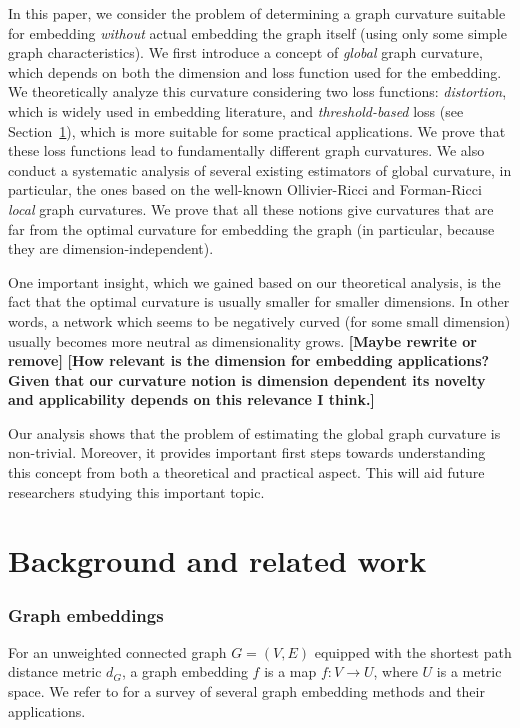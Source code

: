 \documentclass[runningheads]{llncs}
\newcommand{\ch}[1]{{\color{red} #1}}
\begin{document}
In this paper, we \ch{consider the problem} of determining a graph curvature suitable for embedding \textit{without} actual embedding the graph itself (using only some simple graph characteristics). 
We first introduce a concept of \textit{global} graph curvature, which depends on both the dimension and loss function used for the embedding. 
We theoretically analyze this curvature considering two loss functions: \emph{distortion}, which is widely used in embedding literature, and \emph{threshold-based} loss (see Section~\ref{sec:related_work}), which is more suitable for some practical applications. 
We prove that these loss functions lead to fundamentally different graph curvatures. 
We also conduct a systematic analysis of several existing estimators of global curvature, in particular, the ones based on the well-known Ollivier-Ricci and Forman-Ricci \textit{local} graph curvatures. 
We prove that all these notions give curvatures that are far from the optimal curvature for embedding the graph (in particular, because they are dimension-independent). 

One important insight, which we gained based on our theoretical analysis, is the fact that the optimal curvature is usually smaller for smaller dimensions. In other words, a network which seems to be negatively curved (for some small dimension) usually becomes more neutral as dimensionality grows. \textbf{[Maybe rewrite or remove]}
\textbf{[How relevant is the dimension for embedding applications? Given that our curvature notion is dimension dependent its novelty and applicability depends on this relevance I think.]}

Our analysis shows that the problem of estimating the global graph curvature is non-trivial. \ch{Moreover, it provides important first steps towards understanding this concept from both a theoretical and practical aspect. This will aid future researchers studying this important topic.}  

\section{Background and related work}\label{sec:related_work}

\subsubsection{Graph embeddings} 
For an unweighted connected graph $G = (V,E)$ equipped with the shortest path distance metric $d_G$, a graph embedding $f$ is a map $f: V \rightarrow U$, where $U$ is a metric space. We refer to \cite{goyal2018graph} for a survey of several graph embedding methods and their applications. 
\end{document}
